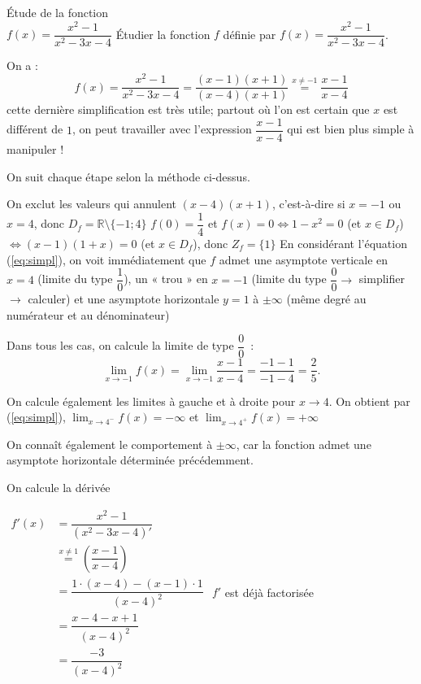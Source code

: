 \documentclass[a4paper,12pt]{article}
\begin{document}
\begin{exemple}
Étude de la fonction\\
\medskip
$f(x) = \dfrac{x^2-1}{x^2-3x-4}$
\tcblower	
Étudier la fonction $f$ définie par $f(x) = \dfrac{x^2-1}{x^2-3x-4}$.

On a : 
\begin{equation}
	f(x) = \dfrac{x^2-1}{x^2-3x-4} = \dfrac{(x-1)(x+1)}{(x-4)(x+1)} \stackrel{x\neq -1}{=} \dfrac{x-1}{x-4} \label{eq:simpl}\tag{$\star$}
\end{equation}
cette dernière simplification est très utile; partout où l'on est certain que $x$ est différent de $1$, on peut travailler avec l'expression $\dfrac{x-1}{x-4}$ qui est bien plus simple à manipuler !

On suit chaque étape selon la méthode ci-dessus.
\begin{tasks}
	\task On exclut les valeurs qui annulent $(x-4)(x+1)$, c'est-à-dire si $x = -1$ ou $x = 4$, donc $D_f = \mathbb{R} \setminus \{-1;4\}$
	\task $f(0) = \dfrac{1}{4}$ et $f(x) = 0 \Leftrightarrow 1-x^2 = 0$ (et $x \in D_f$) $\Leftrightarrow (x-1)(1+x) = 0$ (et $x \in D_f$), donc $Z_f = \{1\}$
	\task En considérant l'équation (\ref{eq:simpl}), on voit immédiatement que $f$ admet une asymptote verticale en $x = 4$ (limite du type $\dfrac{1}{0}$), un « trou » en $x = -1$ (limite du type $\dfrac{0}{0} \rightarrow$ simplifier $\rightarrow$ calculer) et une asymptote horizontale $y = 1$ à $\pm\infty$ (même degré au numérateur et au dénominateur)

Dans tous les cas, on calcule la limite de type $\dfrac{0}{0}$~:
\[\displaystyle\lim_{x \to -1} f(x) = \displaystyle\lim_{x \to -1} \dfrac{x-1}{x-4} = \dfrac{-1-1}{-1-4} = \dfrac{2}{5}.\]

On calcule également les limites à gauche et à droite pour $x\to 4$. On obtient par (\ref{eq:simpl}), $\displaystyle\lim_{x\to 4^-}f(x)=-\infty$ et $\displaystyle\lim_{x\to 4^+}f(x)=+\infty$ 

On connaît également le comportement à $\pm\infty$, car la fonction admet une asymptote horizontale déterminée précédemment.

\task 
On calcule la dérivée 

$\begin{aligned}
	f'(x) &= \dfrac{x^2-1}{(x^2-3x-4)'}\\
	      &\stackrel{x\neq 1}{=} \left(\dfrac{x-1}{x-4}\right)\\
	      &= \dfrac{1 \cdot (x-4)-(x-1) \cdot 1}{(x-4)^2}\\
	      &= \dfrac{x-4-x+1}{(x-4)^2}\\
	      &= \dfrac{-3}{(x-4)^2}
\end{aligned}
$
\task  $f'$ est déjà factorisée


\end{tasks}
\end{exemple}
\end{document}
